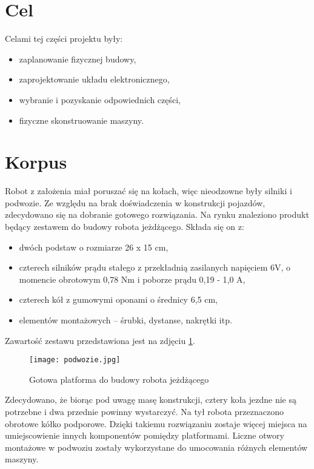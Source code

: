\section{Cel}
Celami tej części projektu były:
\begin{itemize}
    \item zaplanowanie fizycznej budowy,
    \item zaprojektowanie układu elektronicznego,
    \item wybranie i pozyskanie odpowiednich części,
    \item fizyczne skonstruowanie maszyny.
\end{itemize}

\section{Korpus}
Robot z założenia miał poruszać się na kołach, więc nieodzowne były silniki i podwozie.
Ze względu na brak doświadczenia w konstrukcji pojazdów, zdecydowano się na dobranie gotowego rozwiązania.
Na rynku znaleziono produkt będący zestawem do budowy robota jeżdżącego.
Składa się on z:
\begin{itemize}
    \item dwóch podstaw o rozmiarze 26 x 15 cm,
    \item czterech silników prądu stałego z przekładnią zasilanych napięciem 6V, o momencie obrotowym 0,78 Nm i poborze prądu 0,19 - 1,0 A,
    \item czterech kół z gumowymi oponami o średnicy 6,5 cm,
    \item elementów montażowych -- śrubki, dystanse, nakrętki itp.
\end{itemize}
Zawartość zestawu przedstawiona jest na zdjęciu \ref{rys:podwozie}.
\begin{figure}[!hb]
    \centering \texttt{[image: podwozie.jpg]}
    \caption{Gotowa platforma do budowy robota jeżdżącego}
    \label{rys:podwozie}
\end{figure}

Zdecydowano, że biorąc pod uwagę masę konstrukcji, cztery koła jezdne nie są potrzebne i dwa przednie powinny wystarczyć.
Na tył robota przeznaczono obrotowe kółko podporowe.
Dzięki takiemu rozwiązaniu zostaje więcej miejsca na umiejscowienie innych komponentów pomiędzy platformami.
Liczne otwory montażowe w podwoziu zostały wykorzystane do umocowania różnych elementów maszyny.

